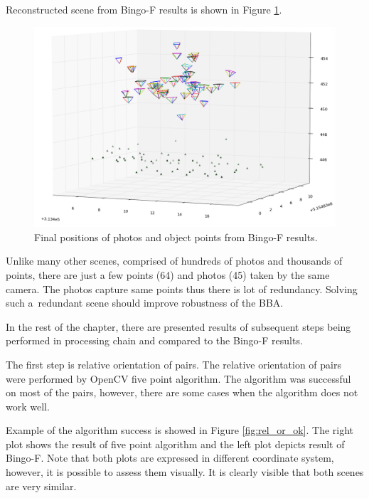 \documentclass[a4paper,12pt]{article}
\begin{document}
Reconstructed  scene from Bingo-F results is shown in Figure \ref{fig:bingo_result}.

\begin{center}
 \begin{figure}[!h]
    \includegraphics[scale=0.4]{figures/bingo_result.png}
    \caption{Final positions of photos and object points from Bingo-F results.}
    \label{fig:bingo_result}
\end{figure}
\end{center}

Unlike many other scenes, comprised of hundreds of photos and thousands of points,   
there are just a few points (64) and photos (45) taken by the same camera. 
The photos capture same points thus there 
is lot of redundancy. Solving such a~redundant scene should improve robustness of the BBA. 

In the rest of the chapter, there are presented results of subsequent steps being performed in processing chain and compared 
to the Bingo-F results.

The first step is relative orientation of pairs. The relative orientation of pairs were performed by OpenCV five point algorithm.
The algorithm was successful on most of the pairs, however, there are some cases when the algorithm does not work well.

Example of the algorithm success is showed in Figure \ref{fig:rel_or_ok}. The right plot shows the result of five point algorithm and the left plot depicts result of Bingo-F. Note that both 
plots are expressed in different coordinate system, however, it is possible to assess them visually. It is clearly visible
that both scenes are very similar.
\end{document}
